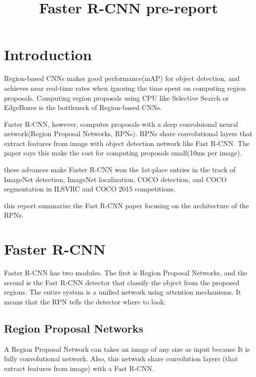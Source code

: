 \documentclass[extendedabs]{bmvc2k}
\begin{document}
\title{Faster R-CNN pre-report}

 

\maketitle
\noindent


\section{Introduction}
Region-based CNNs makes good performance(mAP) for object detection, and achieves near real-time rates when ignoring the time spent on computing region proposals. Computing region proposals using CPU like Selective Search\cite{selsearch} or EdgeBoxes\cite{edgebox} is the bottleneck of Region-based CNNs.

Faster R-CNN\cite{fasterrcnn}, however, computes proposals with a deep convoluional neural network(Region Proposal Networks, RPNs). RPNs share convolutional layers that extract features from image with object detection network like Fast R-CNN\cite{fastrcnn}. The paper\cite{fasterrcnn} says this make the cost for computing proposals small(10ms per image).

these advances make Faster R-CNN\cite{fasterrcnn} won the 1st-place entries in the track of ImageNet detection, ImageNet localization, COCO detection, and COCO segmentation in ILSVRC and COCO 2015 competitions.

this report summarize the Fast R-CNN paper\cite{fasterrcnn} focusing on the architecture of the RPNs.

\section{Faster R-CNN}
Faster R-CNN\cite{fasterrcnn} has two modules. The first is Region Proposal Networks, and the second is the Fast R-CNN\cite{fastrcnn} detector that classify the object from the proposed regions. The entire system is a unified network using attention mechanisms. It means that the RPN tells the detector where to look.
\subsection{Region Proposal Networks}
A Region Proposal Network can takes an image of any size as input because It is fully convolutional network. Also, this network share convolution layers (that extract features from image) with a Fast R-CNN.
\end{document}
